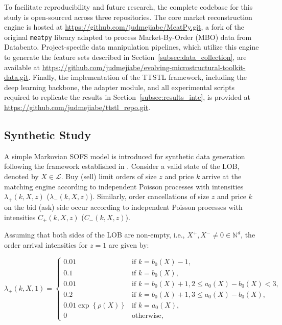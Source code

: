 \documentclass[10pt,a4paper,oneside]{article}
\newcommand{\Bo}{\mathcal{L}}
\begin{document}
To facilitate reproducibility and future research, the complete codebase for this study is open-sourced across three repositories. The core market reconstruction engine is hosted at \url{https://github.com/judmejiabe/MeatPy.git}, a fork of the original \verb|meatpy| library adapted to process Market-By-Order (MBO) data from Databento. Project-specific data manipulation pipelines, which utilize this engine to generate the feature sets described in Section~\ref{subsec:data_collection}, are available at \url{https://github.com/judmejiabe/evolving-microstructural-toolkit-data.git}. Finally, the implementation of the TTSTL framework, including the deep learning backbone, the adapter module, and all experimental scripts required to replicate the results in Section~\ref{subsec:results_intc}, is provided at \url{https://github.com/judmejiabe/ttstl_repo.git}.

\subsection{Synthetic Study}
\label{subsec:synthetic_study}

A simple Markovian SOFS model is introduced for synthetic data generation following the framework established in \cite{cont2023mathematical}. Consider a valid state of the LOB, denoted by $X \in \Bo$. Buy (sell) limit orders of size $z$ and price $k$ arrive at the matching engine according to independent Poisson processes with intensities $\lambda_{+}(k, X, z)$ ($\lambda_{-}(k, X, z)$). Similarly, order cancellations of size $z$ and price $k$ on the bid (ask) side occur according to independent Poisson processes with intensities $C_+(k, X, z)$ ($C_-(k, X, z)$).

Assuming that both sides of the LOB are non-empty, i.e., $X^+, X^- \neq 0 \in \mathbb{N}^d$, the order arrival intensities for $z=1$ are given by:

\[
    \lambda_+(k, X, 1) =
    \begin{cases}
        0.01                               & \text{if } k = b_0(X) - 1,                             \\
        0.1                                & \text{if } k = b_0(X),                                 \\
        0.01                               & \text{if } k = b_0(X) + 1, 2 \leq a_0(X) - b_0(X) < 3, \\
        0.2                                & \text{if } k = b_0(X) + 1, 3 \leq a_0(X) - b_0(X),     \\
        0.01 \exp \left\{ \rho(X) \right\} & \text{if } k = a_0(X),                                 \\
        0                                  & \text{otherwise,}
    \end{cases}
\]
\end{document}
